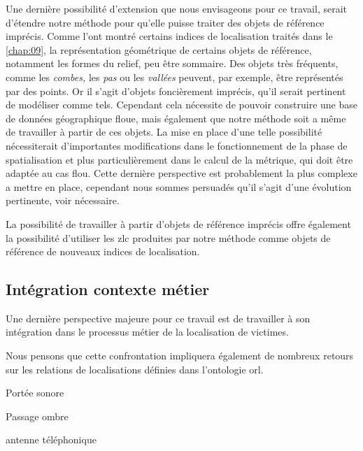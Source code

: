 Une dernière possibilité d'extension que nous envisageons pour ce
travail, serait d'étendre notre méthode pour qu'elle puisse traiter
des objets de référence imprécis. Comme l'ont montré certains indices
de localisation traités dans le \autoref{chap:09}, la représentation
géométrique de certains objets de référence, notamment les formes du
relief, peu être sommaire. Des objets très fréquents, comme les
\emph{combes,} les \emph{pas} ou les \emph{vallées} peuvent, par
exemple, être représentés par des points. Or il s'agit d'objets
foncièrement imprécis, qu'il serait pertinent de modéliser comme
tels. Cependant cela nécessite de pouvoir construire une base de
données géographique floue, mais également que notre méthode soit a
même de travailler à partir de ces objets. La mise en place d'une
telle possibilité nécessiterait d'importantes modifications dans le
fonctionnement de la phase de spatialisation et plus particulièrement
dans le calcul de la métrique, qui doit être adaptée au cas
flou. Cette dernière perspective est probablement la plus complexe a
mettre en place, cependant nous sommes persuadés qu'il s'agit d'une
évolution pertinente, voir nécessaire.


La possibilité de travailler à partir d'objets de référence imprécis
offre également la possibilité d'utiliser les \ac{zlc} produites par
notre méthode comme objets de référence de nouveaux indices de
localisation.

\subsection*{Intégration contexte métier}

Une dernière perspective majeure pour ce travail est de travailler à
son intégration dans le processus métier de la localisation de victimes.




Nous pensons que cette confrontation impliquera également de nombreux
retours sur les relations de localisations définies dans l'ontologie
\ac{orl}.

Portée sonore

Passage ombre

antenne téléphonique



